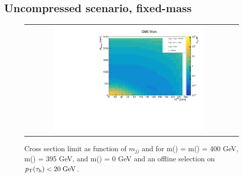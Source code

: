 
\subsection*{Uncompressed scenario, fixed-\stau mass}

\FloatBarrier


\begin{figure}[tbh!]
	\centering
	\begin{tabular}{cc}
		\includegraphics[width=0.75\textwidth]{analysis/pics/JetInvMass_vs_MET_xseclim_Chargino400_Stau395_LSP000_taupt20.pdf}
	\end{tabular}
	\caption{Cross section limit as function of $m_{jj}$ and \met for m(\charginopm) = m(\neutralinotwo) = 400 GeV,  m(\stau) = 395 GeV, and m(\neutralinoone) = 0 GeV and an offline selection on $p_{\text{T}}(\tau_{\text{h}}) <  20\;\text{Ge}\kern-0.06667em\text{V}$.}
	\label{fig::JetInvMass_vs_MET_xseclim_Chargino400_Stau395_LSP000_taupt20}
\end{figure}

